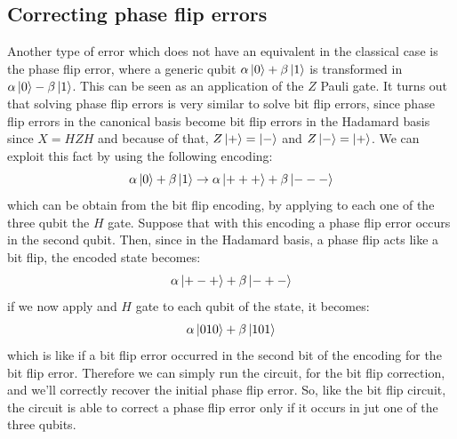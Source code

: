 \documentclass{article}
\begin{document}
	\subsection{Correcting phase flip errors}
	Another type of error which does not have an equivalent in the classical case is the phase flip error, where a generic qubit $\alpha \ket{0} + \beta\ket{1}$ is transformed in $\alpha\ket{0} - \beta\ket{1}$. This can be seen as an application of the $Z$ Pauli gate. It turns out that solving phase flip errors is very similar to solve bit flip errors, since phase flip errors in the canonical basis become bit flip errors in the Hadamard basis since $X = HZH$ and because of that, $Z\ket{+} = \ket{-}$ and $Z\ket{-} = \ket{+}$. We can exploit this fact by using the following encoding:
	\[ \alpha\ket{0} + \beta\ket{1} \rightarrow \alpha\ket{+++} + \beta\ket{---}\]
	which can be obtain from the bit flip encoding, by applying to each one of the three qubit the $H$ gate. Suppose that with this encoding a phase flip error occurs in the second qubit. Then, since in the Hadamard basis, a phase flip acts like a bit flip, the encoded state becomes:
	\[  \alpha\ket{+-+} + \beta\ket{-+-} \]
	if we now apply and $H$ gate to each qubit of the state, it becomes:
	\[  \alpha\ket{010} + \beta\ket{101} \]
	which is like if a bit flip error occurred in the second bit of the encoding for the bit flip error. Therefore we can simply run the circuit, for the bit flip correction, and we'll correctly recover the initial phase flip error. So, like the bit flip circuit, the circuit is able to correct a phase flip error only if it occurs in jut one of the three qubits. 
	
\end{document}
